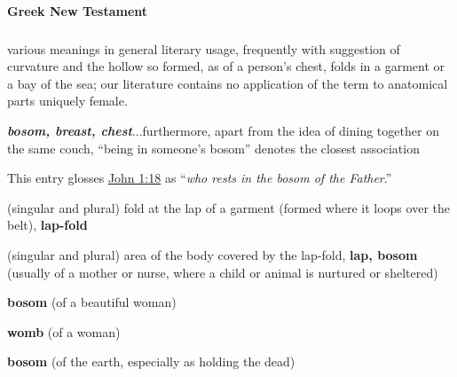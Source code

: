 			
			
		\paragraph{Greek New Testament} %
			\label{BOSOM-GREEK}
		
			\subparagraph{\texorpdfstring{}{}}
				\label{KOLPOS}
			
				\begin{compactdesc}
					\item[BDAG 493a] various meanings in general literary usage, frequently with suggestion of curvature and the hollow so formed, as of a person's chest, folds in a garment or a bay of the sea; our literature contains no application of the term to anatomical parts uniquely female.
						\begin{compactitem}
							\item[1] \textbf{\textit{bosom, breast, chest}}...furthermore, apart from the idea of dining together on the same couch, ``being in someone's bosom'' denotes the closest association
								\begin{compactitem}
									\item This entry glosses \hyperref[JOHN-1-18]{John 1:18} as ``\textit{who rests in the bosom of the Father}.''
								\end{compactitem} 
						\end{compactitem}
					\item[CGL 819a, PDF 859] \textbf{}
						\begin{compactitem}
							\item[1] (singular and plural) fold at the lap of a garment (formed where it loops over the belt), \textbf{lap-fold}
							\item[2] (singular and plural) area of the body covered by the lap-fold, \textbf{lap, bosom} (usually of a mother or nurse, where a child or animal is nurtured or sheltered)
							\item[3] \textbf{bosom} (of a beautiful woman)
							\item[4] \textbf{womb} (of a woman)
							\item[5] \textbf{bosom} (of the earth, especially as holding the dead)

\end{compactitem}
\end{compactdesc}
